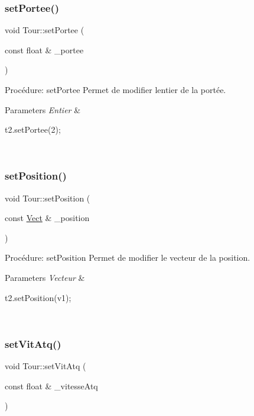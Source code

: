 \subsubsection{\texorpdfstring{set\+Portee()}{setPortee()}}
{\footnotesize\ttfamily void Tour\+::set\+Portee (\begin{DoxyParamCaption}\item[{const float \&}]{\+\_\+portee }\end{DoxyParamCaption})}



Procédure\+: set\+Portee Permet de modifier l\textquotesingle{}entier de la portée. 


\begin{DoxyParams}{Parameters}
{\em Entier} & 
\begin{DoxyCode}
t2.setPortee(2);
\end{DoxyCode}
 \\
\hline
\end{DoxyParams}
\mbox{\label{classTour_a1db07b7ed15a7b0d11e96bb67831feba}} 
\subsubsection{\texorpdfstring{set\+Position()}{setPosition()}}
{\footnotesize\ttfamily void Tour\+::set\+Position (\begin{DoxyParamCaption}\item[{const \hyperlink{classVect}{Vect} \&}]{\+\_\+position }\end{DoxyParamCaption})}



Procédure\+: set\+Position Permet de modifier le vecteur de la position. 


\begin{DoxyParams}{Parameters}
{\em Vecteur} & 
\begin{DoxyCode}
t2.setPosition(v1);
\end{DoxyCode}
 \\
\hline
\end{DoxyParams}
\mbox{\label{classTour_a110c73fc4160189cdafbb700f3999a39}} 
\subsubsection{\texorpdfstring{set\+Vit\+Atq()}{setVitAtq()}}
{\footnotesize\ttfamily void Tour\+::set\+Vit\+Atq (\begin{DoxyParamCaption}\item[{const float \&}]{\+\_\+vitesse\+Atq }\end{DoxyParamCaption})}



